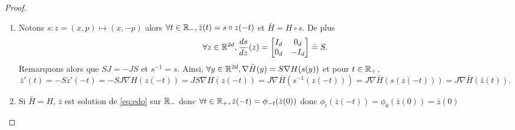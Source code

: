 \documentclass[10pt,a4paper]{article}
\begin{document}
\begin{proof}
	\begin{enumerate}
		\item   Notons $s : z = (x,p) \mapsto (x,-p)$ alors $\forall t \in \mathbb{R}_-, \bar{z}(t) = s \circ z (-t)$ et $\bar{H} = H \circ s$. De plus
		\begin{equation}\label{eq:ds_dz}
		\forall z \in \mathbb{R}^{2d}, \frac{ds}{dz}(z) = \begin{bmatrix} I_d & 0_d \\ 0_d & -I_d \end{bmatrix} \doteq S.
		\end{equation}
		Remarquons alors que $S J = - J S$ et $s^{-1} = s$. Ainsi, $\forall y \in \mathbb{R}^{2d}, \nabla \bar{H} (y) = S \nabla H (s(y))$ et pour $t \in \mathbb{R}_+$,
		  $$
		  \bar{z}'(t) = - S z'(-t) = - S J \nabla H (z(-t)) = J S \nabla H(z(-t)) =  J \nabla \bar{H} (s^{-1}(z(-t))) = J \nabla \bar{H} (s(z(-t))) = J \nabla \bar{H} (\bar{z}(t)).
		  $$
		\item Si $\bar{H} = H$, $\bar{z}$ est solution de \eqref{eq:edo} sur $\mathbb{R}_-$ donc $\forall t \in \mathbb{R}_+, \bar z(-t) = \phi_{-t}(\bar z(0))$ donc $\phi_t(\bar{z}(-t)) = \phi_0(\bar{z}(0)) = \bar{z}(0)$
	\end{enumerate}
\end{proof}
\end{document}
